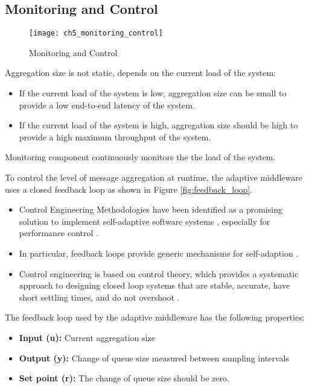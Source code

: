 \subsection{Monitoring and Control}

\begin{figure}[htbp]
	\centering
	\texttt{[image: ch5\_monitoring\_control]}
	\caption{Monitoring and Control}
	\label{fig:ch05_monitoring_control}
\end{figure}

Aggregation size is not static, depends on the current load of the system:
\begin{itemize}
	\item If the current load of the system is low, aggregation size can be small to provide a low end-to-end latency of the system.
	\item If the current load of the system is high, aggregation size should be high to provide a high maximum throughput of the system. 
\end{itemize}

Monitoring component continuously monitors the the load of the system. 

To control the level of message aggregation at runtime, the adaptive middleware uses a closed feedback loop as shown in Figure \ref{fig:feedback_loop}.

\begin{itemize}
	\item Control Engineering Methodologies have been identified as a promising solution to implement self-adaptive software systems \citep{Patikirikorala:2012ky}, especially for performance control \citep{Abdelzaher:2003ea}.
	\item In particular, feedback loops provide generic mechanisms for self-adaption \citep{Brun:2009ww}. 
	\item Control engineering is based on control theory, which provides a systematic approach to designing closed loop systems that are stable, accurate, have short settling times, and do not overshoot \citep{Abdelzaher:2008ub}.
\end{itemize}

The feedback loop used by the adaptive middleware has the following properties:

\begin{itemize}
	\item \textbf{Input (u):} Current aggregation size
	\item \textbf{Output (y):} Change of queue size measured between sampling intervals
	\item \textbf{Set point (r):} The change of queue size should be zero.
\end{itemize}

